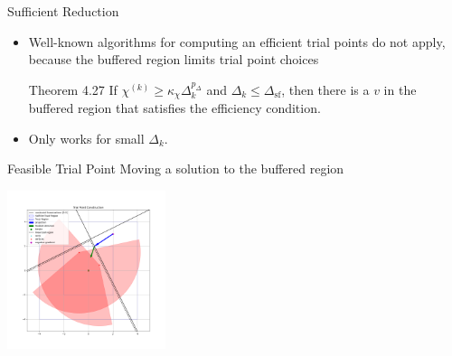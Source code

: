 \documentclass{beamer}
\newcommand{\dk}{{\Delta_k}}
\begin{document}

\begin{frame}{Sufficient Reduction}
	\begin{itemize}
		\item Well-known algorithms for computing an efficient trial points do not apply,
		because the buffered region limits trial point choices
		
		\begin{block}{Theorem 4.27}
			If $\chi^{(k)} \ge \kappa_{\chi} \Delta_k^{p_{\Delta}}$ and $\Delta_k \le \Delta_{\textrm{sf}}$,
			then there is a $v$ in the buffered region that satisfies the efficiency condition.
		\end{block}
		\item Only works for small $\Delta_k$.
		
	\end{itemize}
\end{frame}


\begin{frame}{Feasible Trial Point}
	Moving a solution to the buffered region
	\begin{center}
		\includegraphics[width=175px]{images/trial_point_constructions.png}
	\end{center}
\end{frame}
\end{document}
